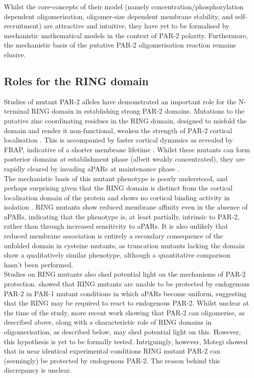 \documentclass[12pt]{"report"}
\begin{document}
Whilst the core-concepts of their model (namely concentration/phosphorylation dependent oligomerisation, oligomer-size dependent membrane stability, and self-recruitment) are attractive and intuitive, they have yet to be formalised by mechanistic mathematical models in the context of PAR-2 polarity. Furthermore, the mechanistic basis of the putative PAR-2 oligomerisation reaction remains elusive.\\


\subsection{Roles for the RING domain}

Studies of mutant PAR-2 alleles have demonstrated an important role for the N-terminal RING domain in establishing strong PAR-2 domains. Mutations to the putative zinc coordinating residues in the RING domain, designed to misfold the domain and render it non-functional, weaken the strength of PAR-2 cortical localisation \citep{Hao2006}. This is accompanied by faster cortical dynamics as revealed by FRAP, indicative of a shorter membrane lifetime \citep{Motegi2011}. Whilst these mutants can form posterior domains at establishment phase (albeit weakly concentrated), they are rapidly cleared by invading aPARs at maintenance phase \citep{Hao2006}.\\

The mechanistic basis of this mutant phenotype is poorly understood, and perhaps surprising given that the RING domain is distinct from the cortical localisation domain of the protein and shows no cortical binding activity in isolation \citep{Hao2006}. RING mutants show reduced membrane affinity even in the absence of aPARs, indicating that the phenotype is, at least partially, intrinsic to PAR-2, rather than through increased sensitivity to aPARs. It is also unlikely that reduced membrane association is entirely a secondary consequence of the unfolded domain in cysteine mutants, as truncation mutants lacking the domain show a qualitatively similar phenotype, although a quantitative comparison hasn’t been performed.\\

Studies on RING mutants also shed potential light on the mechanisms of PAR-2 protection. \textcite{Hao2006} showed that RING mutants are unable to be protected by endogenous PAR-2 in PAR-1 mutant conditions in which aPARs become uniform, suggesting that the RING may be required to react to endogenous PAR-2. Whilst unclear at the time of the study, more recent work showing that PAR-2 can oligomerise, as described above, along with a characteristic role of RING domains in oligomerisation, as described below, may shed potential light on this. However, this hypothesis is yet to be formally tested. Intriguingly, however, Motegi showed that in near identical experimental conditions RING mutant PAR-2 can (seemingly) be protected by endogenous PAR-2. The reason behind this discrepancy is unclear.\\
\end{document}
